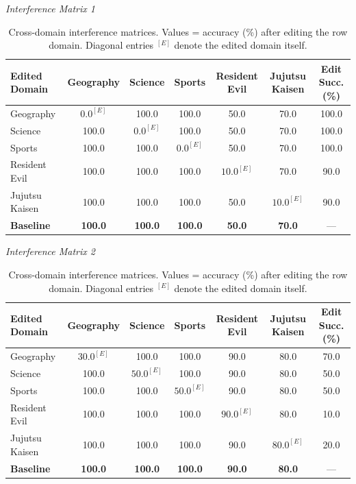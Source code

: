 \documentclass[11pt]{article}
\begin{document}
\vspace{3.5mm}
\begin{table}[h]
\centering
\footnotesize
\caption{Cross-domain interference matrices. Values = accuracy (\%) after editing the row domain. Diagonal entries $^{[E]}$ denote the edited domain itself.}
\label{tab:cross_domain_interference}
\textit{Interference Matrix 1}\\[4pt]
\begin{tabular}{lcccccc}
\toprule
\textbf{Edited Domain} & \textbf{Geography} & \textbf{Science} & \textbf{Sports} & \textbf{Resident Evil} & \textbf{Jujutsu Kaisen} & \textbf{Edit Succ. (\%)} \\
\midrule
Geography       & $0.0^{[E]}$   & 100.0 & 100.0 & 50.0          & 70.0           & 100.0 \\
Science         & 100.0         & $0.0^{[E]}$   & 100.0 & 50.0   & 70.0           & 100.0 \\
Sports          & 100.0         & 100.0 & $0.0^{[E]}$   & 50.0   & 70.0           & 100.0 \\
Resident Evil   & 100.0         & 100.0 & 100.0 & $10.0^{[E]}$  & 70.0           & 90.0  \\
Jujutsu Kaisen  & 100.0         & 100.0 & 100.0 & 50.0          & $10.0^{[E]}$   & 90.0  \\
\midrule
\textbf{Baseline} & \textbf{100.0} & \textbf{100.0} & \textbf{100.0} & \textbf{50.0} & \textbf{70.0} & --- \\
\bottomrule
\end{tabular}

\vspace{6pt}
\textit{Interference Matrix 2}\\[4pt]
\begin{tabular}{lcccccc}
\toprule
\textbf{Edited Domain} & \textbf{Geography} & \textbf{Science} & \textbf{Sports} & \textbf{Resident Evil} & \textbf{Jujutsu Kaisen} & \textbf{Edit Succ. (\%)} \\
\midrule
Geography       & $30.0^{[E]}$  & 100.0 & 100.0 & 90.0          & 80.0           & 70.0  \\
Science         & 100.0         & $50.0^{[E]}$  & 100.0 & 90.0   & 80.0           & 50.0  \\
Sports          & 100.0         & 100.0 & $50.0^{[E]}$  & 90.0   & 80.0           & 50.0  \\
Resident Evil   & 100.0         & 100.0 & 100.0 & $90.0^{[E]}$  & 80.0           & 10.0  \\
Jujutsu Kaisen  & 100.0         & 100.0 & 100.0 & 90.0          & $80.0^{[E]}$   & 20.0  \\
\midrule
\textbf{Baseline} & \textbf{100.0} & \textbf{100.0} & \textbf{100.0} & \textbf{90.0} & \textbf{80.0} & --- \\
\bottomrule
\end{tabular}
\end{table}
\end{document}
